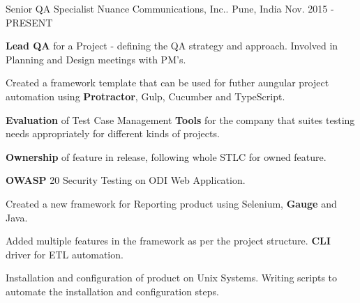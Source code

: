 

\begin{cventries}

  \cventry
    {Senior QA Specialist} %
    {Nuance Communications, Inc..} %
    {Pune, India} %
    {Nov. 2015 - PRESENT} %
    {
      \begin{cvitems} %
	    \item {\textbf{Lead QA} for a Project - defining the QA strategy and approach. Involved in Planning and Design meetings with PM's.}
		\item {Created a framework template that can be used for futher aungular project automation using \textbf{Protractor}, Gulp, Cucumber and TypeScript.}
		\item {\textbf{Evaluation} of Test Case Management \textbf{Tools} for the company that suites testing needs appropriately for different kinds of projects.}
        \item {\textbf{Ownership} of feature in release, following whole STLC for owned feature.}
		\item {\textbf{OWASP} 20 Security Testing on ODI Web Application.}
        \item {Created a new framework for Reporting product using Selenium, \textbf{Gauge} and Java.}
        \item {Added multiple features in the framework as per the project structure. \textbf{CLI} driver for ETL automation.}
        \item {Installation and configuration of product on Unix Systems. Writing scripts to automate the installation and configuration steps.}
      \end{cvitems}
    }


\end{cventries}
